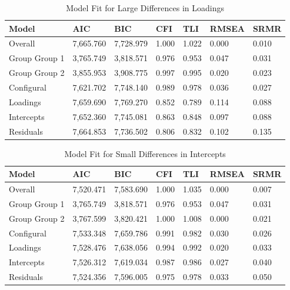 \documentclass[
  man]{apa7}
\begin{document}
\begin{table}[tbp]

\begin{center}
\begin{threeparttable}

\caption{\label{tab:tab4}Model Fit for Large Differences in Loadings}

\begin{tabular}{lllllll}
\toprule
Model & AIC & BIC & CFI & TLI & RMSEA & SRMR\\
\midrule
Overall & 7,665.760 & 7,728.979 & 1.000 & 1.022 & 0.000 & 0.010\\
Group Group 1 & 3,765.749 & 3,818.571 & 0.976 & 0.953 & 0.047 & 0.031\\
Group Group 2 & 3,855.953 & 3,908.775 & 0.997 & 0.995 & 0.020 & 0.023\\
Configural & 7,621.702 & 7,748.140 & 0.989 & 0.978 & 0.036 & 0.027\\
Loadings & 7,659.690 & 7,769.270 & 0.852 & 0.789 & 0.114 & 0.088\\
Intercepts & 7,652.360 & 7,745.081 & 0.863 & 0.848 & 0.097 & 0.088\\
Residuals & 7,664.853 & 7,736.502 & 0.806 & 0.832 & 0.102 & 0.135\\
\bottomrule
\end{tabular}

\end{threeparttable}
\end{center}

\end{table}

\begin{table}[tbp]

\begin{center}
\begin{threeparttable}

\caption{\label{tab:tab5}Model Fit for Small Differences in Intercepts}

\begin{tabular}{lllllll}
\toprule
Model & AIC & BIC & CFI & TLI & RMSEA & SRMR\\
\midrule
Overall & 7,520.471 & 7,583.690 & 1.000 & 1.035 & 0.000 & 0.007\\
Group Group 1 & 3,765.749 & 3,818.571 & 0.976 & 0.953 & 0.047 & 0.031\\
Group Group 2 & 3,767.599 & 3,820.421 & 1.000 & 1.008 & 0.000 & 0.021\\
Configural & 7,533.348 & 7,659.786 & 0.991 & 0.982 & 0.030 & 0.026\\
Loadings & 7,528.476 & 7,638.056 & 0.994 & 0.992 & 0.020 & 0.033\\
Intercepts & 7,526.312 & 7,619.034 & 0.987 & 0.986 & 0.027 & 0.040\\
Residuals & 7,524.356 & 7,596.005 & 0.975 & 0.978 & 0.033 & 0.050\\
\bottomrule
\end{tabular}

\end{threeparttable}
\end{center}

\end{table}
\end{document}

